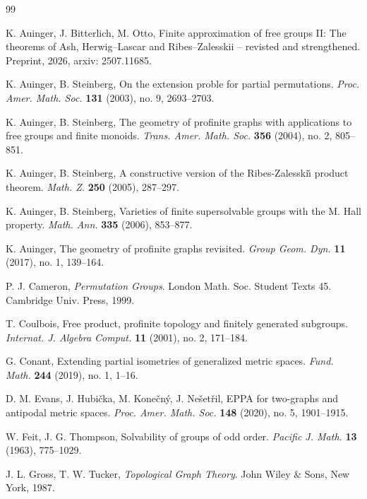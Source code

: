 \documentclass[10pt,a4paper]{amsart}
\theoremstyle{definition}
\theoremstyle{definition}
\numberwithin{equation}{section}
\begin{document}
\begin{thebibliography}{99}

\addtolength{\leftmargin}{0.2in} %
\setlength{\itemindent}{-0.2in} 

K. Auinger, J. Bitterlich, M. Otto,
Finite approximation of free groups II: The theorems of Ash, Herwig--Lascar and Ribes--Zalesskii -- revisted and strengthened.
Preprint, 2026, arxiv: 2507.11685.

K. Auinger, B. Steinberg,
On the extension proble for partial permutations.
\textit{Proc. Amer. Math. Soc.} {\bf 131} (2003), no. 9, 2693--2703.

K. Auinger, B. Steinberg,
The geometry of profinite graphs with applications to free groups and finite monoids.
\textit{Trans. Amer. Math. Soc.} {\bf 356} (2004), no. 2, 805--851.

K. Auinger, B. Steinberg, 
A constructive version of the Ribes-Zalesski\v{\i} product theorem.
\textit{Math. Z.} {\bf 250} (2005), 287--297.

K. Auinger, B. Steinberg,
Varieties of finite supersolvable groups with the M. Hall property.
\textit{Math. Ann.} {\bf 335} (2006), 853--877.

K. Auinger,
The geometry of profinite graphs revisited.
\textit{Group Geom. Dyn.} {\bf 11} (2017), no. 1, 139--164.

P. J. Cameron,
\textit{Permutation Groups}. London Math. Soc. Student Texts 45. Cambridge Univ. Press, 1999.

T. Coulbois,
Free product, profinite topology and finitely generated subgroups.
\textit{Internat. J. Algebra Comput.} {\bf 11} (2001), no. 2, 171--184.

G. Conant, 
Extending partial isometries of generalized metric spaces.
\textit{Fund. Math.} {\bf 244} (2019), no. 1, 1--16.

D. M. Evans, J. Hubi\v{c}ka, M. Kone\v{c}n\'{y}, J. Ne\v{s}et\v{r}il,
EPPA for two-graphs and antipodal metric spaces.
\textit{Proc. Amer. Math. Soc.} {\bf 148} (2020), no. 5, 1901--1915.

W. Feit, J. G. Thompson,
Solvability of groups of odd order.
\textit{Pacific J. Math.} {\bf 13} (1963), 775--1029.

J. L. Gross, T. W. Tucker,
\textit{Topological Graph Theory}. John Wiley \& Sons, New York, 1987.



\end{thebibliography}
\end{document}
